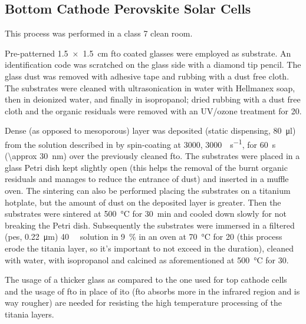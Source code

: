 	\subsection{Bottom Cathode Perovskite Solar Cells}

			This process was performed in a class 7 clean room.

			Pre-patterned \SI{1.5 x 1.5}{\cm} \gls{fto} coated glasses were employed as substrate. An identification code was scratched on the glass side with a diamond tip pencil. The glass dust was removed with adhesive tape and rubbing with a dust free cloth. The substrates were cleaned with ultrasonication in water with Hellmanex soap, then in deionized water, and finally in isopropanol; dried rubbing with a dust free cloth and the organic residuals were removed with an UV/ozone treatment for \SI{20}{\min}.

			Dense (as opposed to mesoporous) \TiOtwo layer was deposited (static dispensing, \SI{80}{\ul}) from the solution described in  by spin-coating at \SI{3000}{\rpm}, \SI{3000}{\rpm\per\s}, for \SI{60}{\s} (\SI{\approx 30}{\nm}) over the previously cleaned \gls{fto}. The substrates were placed in a glass Petri dish kept slightly open (this helps the removal of the burnt organic residuals and manages to reduce the entrance of dust) and inserted in a muffle oven. The sintering can also be performed placing the substrates on a titanium hotplate, but the amount of dust on the deposited layer is greater. Then the substrates were sintered at \SI{500}{\celsius} for \SI{30}{\minute} and cooled down slowly for not breaking the Petri dish. Subsequently the substrates were immersed in a filtered (\gls{pes}, \SI{0.22}{\um}) \SI{40}{\milli\Molar}
			 solution in 9~\%  in an oven at \SI{70}{\celsius} for \SI{20}{\min} (this process erode the titania layer, so it's important to not exceed in the duration), cleaned with water, with isopropanol and calcined as aforementioned at \SI{500}{\celsius} for \SI{30}{\min}.

			The usage of a thicker glass as compared to the one used for top cathode cells and the usage of \gls{fto} in place of \gls{ito} (\gls{fto} absorbs more in the infrared region and is way rougher) are needed for resisting the high temperature processing of the titania layers.



